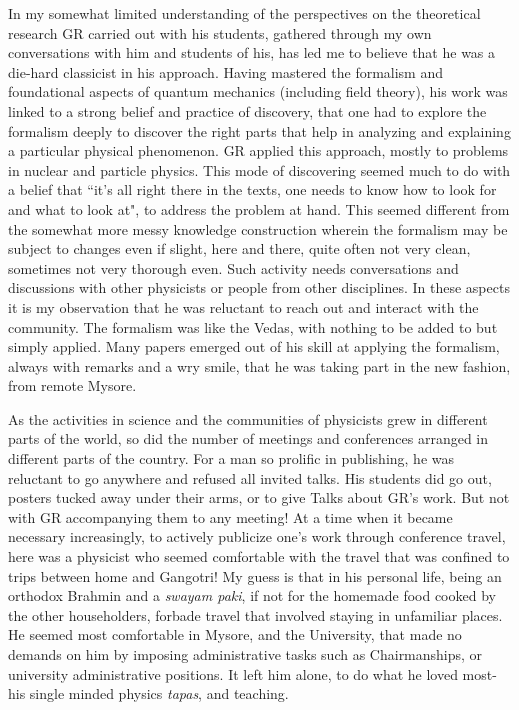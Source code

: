 In my somewhat limited understanding of the perspectives on the theoretical research GR carried out with his students, gathered through my own conversations with him and students of his, has led me to believe that he was a die-hard classicist in his approach. Having mastered the formalism and foundational aspects of quantum mechanics (including field theory), his work was linked to a strong belief and practice of discovery, that one had to explore the formalism deeply to discover the right parts that help in analyzing and explaining a particular physical phenomenon. GR applied this approach, mostly to problems in nuclear and particle physics. This mode of discovering seemed much to do with a belief that ``it's all right there in the texts, one needs to know how to look for and what to look at", to address the problem at hand. This seemed different from the somewhat more messy knowledge construction wherein the formalism may be subject to changes even if slight, here and there, quite often not very clean, sometimes not very thorough even. Such activity needs conversations and discussions with other physicists or people from other disciplines. In these aspects it is my observation that he was reluctant to reach out and interact with the community. The formalism was like the Vedas, with nothing to be added to but simply applied. Many papers emerged out of his skill at applying the formalism, always with remarks and a wry smile, that he was taking part in the new fashion, from remote Mysore.

As the activities in science and the communities of physicists grew in different parts of the world, so did the number of meetings and conferences arranged in different parts of the country. For a man so prolific in publishing, he was reluctant to go anywhere and refused all invited talks. His students did go out, posters tucked away under their arms, or to give Talks about GR's work. But not with GR accompanying them to any meeting! At a time when it became necessary increasingly, to actively publicize one's work through conference travel, here was a physicist who seemed comfortable with the travel that was confined to trips between home and Gangotri!  My guess is that in his personal life, being an orthodox Brahmin and a \textit{swayam paki}, if not for the homemade food cooked by the other householders, forbade travel that involved staying in unfamiliar places. He seemed most comfortable in Mysore, and the University, that made no demands on him by imposing administrative tasks such as Chairmanships, or university administrative positions. It left him alone, to do what he loved most-his single minded physics \textit{tapas}, and teaching.
\vspace{.1cm}

